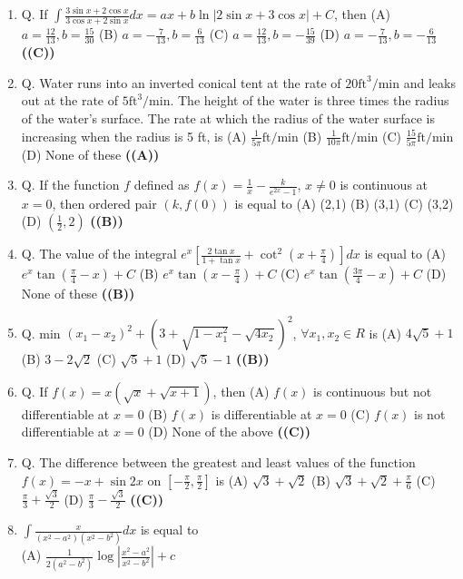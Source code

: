 \documentclass{article}
\begin{document}
\begin{enumerate}
(B) 1:2
(C) 4:3
(D) 2:3 \hfill \textbf{((C))}
\item Q. If $\int \frac{3 \sin x + 2 \cos x}{3 \cos x + 2 \sin x} dx = ax + b \ln |2 \sin x + 3 \cos x| + C$, then
(A) $a = \frac{12}{13}, b = \frac{15}{30}$
(B) $a = -\frac{7}{13}, b = \frac{6}{13}$
(C) $a = \frac{12}{13}, b = -\frac{15}{39}$
(D) $a = -\frac{7}{13}, b = -\frac{6}{13}$ \hfill \textbf{((C))}
\item Q. Water runs into an inverted conical tent at the rate of $20\text{ft}^3/\text{min}$ and leaks out at the rate of $5\text{ft}^3/\text{min}$. The height of the water is three times the radius of the water's surface. The rate at which the radius of the water surface is increasing when the radius is 5 ft, is
(A) $\frac{1}{5\pi} \text{ft/min}$
(B) $\frac{1}{10\pi} \text{ft/min}$
(C) $\frac{15}{5\pi} \text{ft/min}$
(D) None of these \hfill \textbf{((A))}
\item Q. If the function $f$ defined as $f(x) = \frac{1}{x} - \frac{k}{e^{2x}-1}$, $x \neq 0$ is continuous at $x = 0$, then ordered pair $(k, f(0))$ is equal to
(A) (2,1)
(B) (3,1)
(C) (3,2)
(D) $\left(\frac{1}{2},2\right)$ \hfill \textbf{((B))}
\item Q. The value of the integral $e^{x}\left[\frac{2\tan x}{1+\tan x}+\cot^{2}\left(x+\frac{\pi}{4}\right)\right]dx$ is equal to
(A) $e^{x}\tan\left(\frac{\pi}{4}-x\right)+C$
(B) $e^{x}\tan\left(x-\frac{\pi}{4}\right)+C$
(C) $e^{x}\tan\left(\frac{3\pi}{4}-x\right)+C$
(D) None of these \hfill \textbf{((B))}
\item Q. min $(x_1-x_2)^2 + (3 + \sqrt{1 - x_1^2} - \sqrt{4x_2})^2$, $\forall x_1, x_2 \in R$ is
(A) $4\sqrt{5}+1$
(B) $3 - 2\sqrt{2}$
(C) $\sqrt{5}+1$
(D) $\sqrt{5}-1$ \hfill \textbf{((B))}
\item Q. If $f(x) = x(\sqrt{x} + \sqrt{x + 1})$, then
(A) $f(x)$ is continuous but not differentiable at $x = 0$
(B) $f(x)$ is differentiable at $x = 0$
(C) $f(x)$ is not differentiable at $x = 0$
(D) None of the above \hfill \textbf{((C))}
\item Q. The difference between the greatest and least values of the function $f(x) = -x + \sin 2x$
on $[-\frac{\pi}{2}, \frac{\pi}{2}]$ is
(A) $\sqrt{3}+\sqrt{2}$
(B) $\sqrt{3}+\sqrt{2}+\frac{\pi}{6}$
(C) $\frac{\pi}{3}+\frac{\sqrt{3}}{2}$
(D) $\frac{\pi}{3}-\frac{\sqrt{3}}{2}$ \hfill \textbf{((C))}
\item $\int \frac{x}{(x^2-a^2)(x^2-b^2)} dx$ is equal to\\
(A) $\frac{1}{2(a^2-b^2)} \log\left|\frac{x^2-a^2}{x^2-b^2}\right|+c$\\

\end{enumerate}
\end{document}
